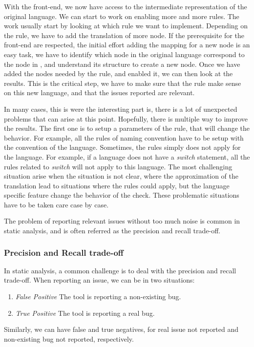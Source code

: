 With the front-end, we now have access to the intermediate representation of the original language. 
We can start to work on enabling more and more rules. 
The work usually start by looking at which rule we want to implement. 
Depending on the rule, we have to add the translation of more node. 
If the prerequisite for the front-end are respected, the initial effort adding the mapping for a new node is an easy task, we have to identify which node in the original language correspond to the node in \slang{}, and understand its structure to create a new node. 
Once we have added the nodes needed by the rule, and enabled it, we can then look at the results. 
This is the critical step, we have to make sure that the rule make sense on this new language, and that the issues reported are relevant. 

In many cases, this is were the interesting part is, there is a lot of unexpected problems that can arise at this point. Hopefully, there is multiple way to improve the results. 
The first one is to setup a parameters of the rule, that will change the behavior. 
For example, all the rules of naming convention have to be setup with the convention of the language. 
Sometimes, the rules simply does not apply for the language. 
For example, if a language does not have a \emph{switch} statement, all the rules related to \emph{switch} will not apply to this language.
The most challenging situation arise when the situation is not clear, where the approximation of the translation lead to situations where the rules could apply, but the language specific feature change the behavior of the check. 
These problematic situations have to be taken care case by case.

The problem of reporting relevant issues without too much noise is common in static analysis, and is often referred as the precision and recall trade-off.

\subsubsection{Precision and Recall trade-off}
\label{subsubsec:precision_recall}

In static analysis, a common challenge is to deal with the precision and recall trade-off. When reporting an issue, we can be in two situations:

\begin{enumerate}
	\item \textit{False Positive} \newline The tool is reporting a non-existing bug.
	\item \textit{True Positive} \newline The tool is reporting a real bug. 
\end{enumerate}
Similarly, we can have false and true negatives, for real issue not reported and non-existing bug not reported, respectively. 

